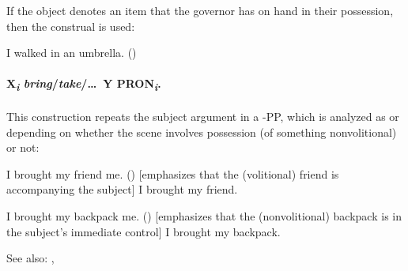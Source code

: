 If the object denotes an item that the governor has on hand in their possession, 
then the construal  is used:
\begin{exe}
  \ex I walked in  an umbrella. ()
\end{exe}

\paragraph{X\textsubscript{\emph{i}} \emph{bring}/\emph{take}/\dots~Y  PRON\textsubscript{\emph{i}}.} 
This construction repeats the subject argument in a -PP, 
which is analyzed as  or 
depending on whether the scene involves possession (of something nonvolitional) or not:
\begin{exe}
  \ex\begin{xlist}
    \ex I brought my friend  me. () [emphasizes that the (volitional) friend is accompanying the subject]
    \ex I brought my friend.
  \end{xlist}
  \ex\begin{xlist}
    \ex I brought my backpack  me. () [emphasizes that the (nonvolitional) backpack is in the subject's immediate control]
    \ex I brought my backpack.
  \end{xlist}
\end{exe}

See also: , 

